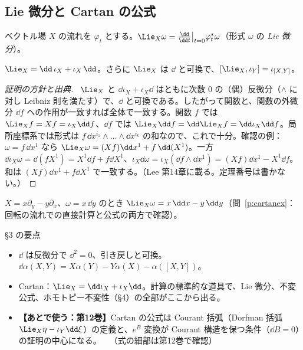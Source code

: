 \subsection{Lie 微分と Cartan の公式}
\begin{defn}
ベクトル場 $X$ の流れを $\varphi_t$ とする。$\Lie_X\omega=\frac{\dd}{\dd t}\big|_{t=0}\varphi_t^*\omega$（形式 $\omega$ の \emph{Lie 微分}）。
\end{defn}

\begin{thm}\label{thm:cartan}
$\Lie_X=\dd\,\iota_X+\iota_X\,\dd$。さらに $\Lie_X$ は $\dd$ と可換で、$[\Lie_X,\iota_Y]=\iota_{[X,Y]}$。
\end{thm}
\begin{proof}[証明の方針と出典]\tC\ $\Lie_X$ と $\dd\iota_X+\iota_X\dd$ はともに次数 $0$ の（偶）反微分（$\wedge$ に対し Leibniz 則を満たす）で、$\dd$ と可換である。したがって関数と、関数の外微分 $\dd f$ への作用が一致すれば全体で一致する。関数 $f$ では $\Lie_Xf=Xf=\iota_X\dd f$、$\dd f$ では $\Lie_X\dd f=\dd\Lie_Xf=\dd\iota_X\dd f$。局所座標系では形式は $f\,\dd x^{i_1}\wedge\dots\wedge\dd x^{i_k}$ の和なので、これで十分。確認の例：$\omega=f\,\dd x^1$ なら $\Lie_X\omega=(Xf)\dd x^1+f\,\dd(X^1)$。一方 $\dd\iota_X\omega=\dd(fX^1)=X^1\dd f+f\dd X^1$、$\iota_X\dd\omega=\iota_X(\dd f\wedge\dd x^1)=(Xf)\dd x^1-X^1\dd f$。和は $(Xf)\dd x^1+f\dd X^1$ で一致する。（Lee 第14章に載る。定理番号は書かない。）
\end{proof}

\begin{ex}
$X=x\partial_y-y\partial_x$、$\omega=x\,\dd y$ のとき $\Lie_X\omega=x\,\dd x-y\,\dd y$（問~\ref{p:cartanex}：回転の流れでの直接計算と公式の両方で確認）。
\end{ex}

\begin{keybox}{§3 の要点}
\begin{itemize}
\item $\dd$ は反微分で $\dd^2=0$、引き戻しと可換。$\dd\alpha(X,Y)=X\alpha(Y)-Y\alpha(X)-\alpha([X,Y])$。
\item Cartan：$\Lie_X=\dd\iota_X+\iota_X\dd$。計算の標準的な道具で、Lie 微分、不変公式、ホモトピー不変性（§4）の全部がここから出る。
\item \textbf{【あとで使う：第12巻】}Cartan の公式は Courant 括弧（Dorfman 括弧 $\Lie_X\eta-\iota_Y\dd\xi$）の定義と、$e^{B}$ 変換が Courant 構造を保つ条件（$\dd B=0$）の証明の中心になる。\ \tQ\ （式の細部は第12巻で確認）
\end{itemize}
\end{keybox}


